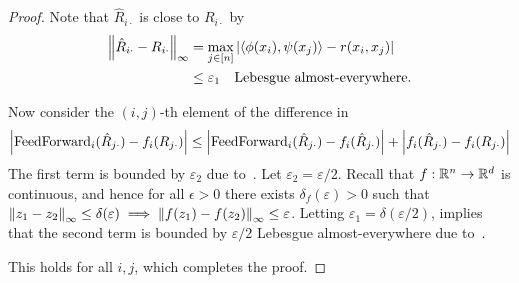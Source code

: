 \begin{proof}
    Note that $\hat{R}_{i\cdot}$ is close to $R_{i\cdot}$ by~
    \begin{equation}\label{eq:approx_proof_R_approx}
        \begin{split}
            \left\lVert\hat{R}_{i\cdot} - R_{i\cdot}\right\rVert_{\infty} &= \max_{j \in [n]} \left\lvert\left \langle \phi(x_i), \psi(x_j) \right\rangle - r(x_i, x_j)\right\rvert \\
            &\leq \varepsilon_1 \quad \text{Lebesgue almost-everywhere}.
        \end{split}
    \end{equation}

    Now consider the $(i,j)$-th element of the difference in~
    \begin{equation*}
        \left\lvert\mathrm{FeedForward}_i(\hat{R}_{j\cdot}) - f_i(R_{j\cdot})\right\rvert \leq \left\lvert\mathrm{FeedForward}_i(\hat{R}_{j\cdot}) - f_i(\hat{R}_{j\cdot})\right\rvert + \left\lvert f_i(\hat{R}_{j\cdot}) - f_i(R_{j\cdot})\right\rvert
    \end{equation*}
    The first term is bounded by $\varepsilon_2$ due to~. Let $\varepsilon_2 = \varepsilon / 2$. Recall that $f: \mathbb{R}^n \to \mathbb{R}^d$ is continuous, and hence for all $\epsilon > 0$ there exists $\delta_f(\varepsilon) > 0$ such that $\left\lVert z_1 - z_2\right\rVert_{\infty} \leq \delta(\varepsilon) \implies \left\lVert f(z_1) - f(z_2)\right\rVert_{\infty} \leq \varepsilon$. Letting $\varepsilon_1 = \delta(\varepsilon / 2)$, implies that the second term is bounded by $\varepsilon / 2$ Lebesgue almost-everywhere due to~.

    This holds for all $i, j$, which completes the proof.

\end{proof}